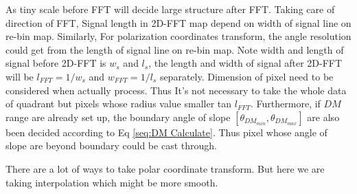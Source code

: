 \documentclass[twocolumn]{aastex61}
\begin{document}
As tiny scale before FFT will decide large structure after FFT. Taking care of direction of FFT, Signal length in 2D-FFT map depend on width of signal line on re-bin map. Similarly, For polarization coordinates transform, the angle resolution could get from the length of signal line on re-bin map.  Note width and length of signal before 2D-FFT is $w_s$ and $l_s$, the length and width of signal after 2D-FFT will be $l_{FFT}=1/w_s$ and $w_{FFT}=1/l_s$ separately. Dimension of pixel need to be considered when actually process.
Thus It's not necessary to take the whole data of quadrant \uppercase\expandafter{} but pixels whose radius value smaller tan $l_{FFT}$.  Furthermore, if $DM$ range are already set up, the boundary angle of slope $[\theta_{DM_{min}},\theta_{DM_{max}}]$ are also been decided according to Eq \ref{seq:DM Calculate}.  Thus pixel whose angle of slope are beyond boundary could be cast through.

There are a lot of ways to take polar coordinate transform. But here we are taking interpolation which might be more smooth. 
%
%
%  
%   
%    
%  
%  
\end{document}
